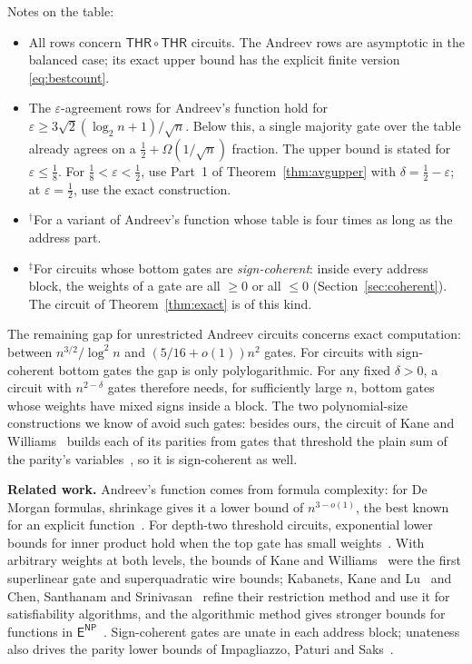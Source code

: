 \documentclass[11pt,letterpaper]{article}
\theoremstyle{remark}
\newcommand{\smalltitle}[1]{\textbf{\color{ink}#1}\quad}
\newcommand{\THR}{\mathsf{THR}}
\begin{document}
Notes on the table:
\begin{itemize}
\item All rows concern $\THR\circ\THR$ circuits.
      The Andreev rows are asymptotic in the balanced case; its exact upper
      bound has the explicit finite version \eqref{eq:bestcount}.
\item The $\varepsilon$-agreement rows for Andreev's function hold for
      $\varepsilon\ge3\sqrt2(\log_2n+1)/\sqrt n$. Below this, a single
      majority gate over the table already agrees on a
      $\tfrac12+\Omega(1/\sqrt n)$ fraction. The upper bound is stated for
      $\varepsilon\le\tfrac18$. For $\tfrac18<\varepsilon<\tfrac12$, use
      Part~1 of Theorem~\ref{thm:avgupper} with $\delta=\tfrac12-\varepsilon$;
      at $\varepsilon=\tfrac12$, use the exact construction.
\item $^\dagger$For a variant of Andreev's function whose table is four times
      as long as the address part.
\item $^\ddagger$For circuits whose bottom gates are \emph{sign-coherent}:
      inside every address block, the weights of a gate are all $\ge0$ or
      all $\le0$ (Section~\ref{sec:coherent}). The circuit of
      Theorem~\ref{thm:exact} is of this kind.
\end{itemize}

The remaining gap for unrestricted Andreev circuits concerns exact computation: between
$n^{3/2}/\log^2n$ and $(5/16+o(1))n^2$ gates. For circuits with sign-coherent
bottom gates the gap is only polylogarithmic. For any fixed $\delta>0$, a circuit with $n^{2-\delta}$
gates therefore needs, for sufficiently large $n$, bottom gates whose
weights have mixed signs inside a block. The two
polynomial-size constructions we know of avoid such gates: besides ours, the
circuit of Kane and Williams~\cite[Thm.~1.2]{KW} builds each of its parities
from gates that threshold the plain sum of the parity's
variables~\cite[Prop.~2.1]{HMPST}, so it is sign-coherent as well.

\smalltitle{Related work.}
Andreev's function comes from formula complexity: for De Morgan formulas,
shrinkage gives it a lower bound of $n^{3-o(1)}$, the best known for an
explicit function~\cite{And87,Has98,Tal14}. For depth-two threshold circuits,
exponential lower bounds for inner product hold when the top gate has small
weights~\cite{HMPST,Nis93}. With arbitrary weights at both
levels, the bounds of Kane and Williams~\cite{KW} were the first superlinear
gate and superquadratic wire bounds; Kabanets, Kane and Lu~\cite{KKL} and Chen,
Santhanam and Srinivasan~\cite{CSS} refine their restriction method and use it
for satisfiability algorithms, and the algorithmic method gives stronger
bounds for functions in $\mathsf E^{\mathsf{NP}}$~\cite{Tam,ACW,CTW}.
Sign-coherent gates are unate in each address block; unateness also drives
the parity lower bounds of Impagliazzo, Paturi and Saks~\cite{IPS}.
\end{document}
